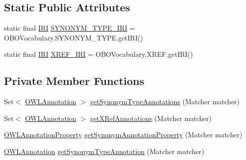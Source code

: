 \subsection*{Static Public Attributes}
\begin{DoxyCompactItemize}
\item 
static final \hyperlink{classorg_1_1semanticweb_1_1owlapi_1_1model_1_1_i_r_i}{I\-R\-I} \hyperlink{classorg_1_1coode_1_1owlapi_1_1obo_1_1parser_1_1_synonym_tag_value_handler_ae93ffc065e9676250659002037c4039d}{S\-Y\-N\-O\-N\-Y\-M\-\_\-\-T\-Y\-P\-E\-\_\-\-I\-R\-I} = O\-B\-O\-Vocabulary.\-S\-Y\-N\-O\-N\-Y\-M\-\_\-\-T\-Y\-P\-E.\-get\-I\-R\-I()
\item 
static final \hyperlink{classorg_1_1semanticweb_1_1owlapi_1_1model_1_1_i_r_i}{I\-R\-I} \hyperlink{classorg_1_1coode_1_1owlapi_1_1obo_1_1parser_1_1_synonym_tag_value_handler_a57fda867a26e9336c4c52b1d08ef62bb}{X\-R\-E\-F\-\_\-\-I\-R\-I} = O\-B\-O\-Vocabulary.\-X\-R\-E\-F.\-get\-I\-R\-I()
\end{DoxyCompactItemize}
\subsection*{Private Member Functions}
\begin{DoxyCompactItemize}
\item 
Set$<$ \hyperlink{interfaceorg_1_1semanticweb_1_1owlapi_1_1model_1_1_o_w_l_annotation}{O\-W\-L\-Annotation} $>$ \hyperlink{classorg_1_1coode_1_1owlapi_1_1obo_1_1parser_1_1_synonym_tag_value_handler_a2e54dcf8155b24189bd23c370109ff88}{get\-Synonym\-Type\-Annotations} (Matcher matcher)
\item 
Set$<$ \hyperlink{interfaceorg_1_1semanticweb_1_1owlapi_1_1model_1_1_o_w_l_annotation}{O\-W\-L\-Annotation} $>$ \hyperlink{classorg_1_1coode_1_1owlapi_1_1obo_1_1parser_1_1_synonym_tag_value_handler_aaf46aa5b3ae68706edfbb1af9308fcf6}{get\-X\-Ref\-Annotations} (Matcher matcher)
\item 
\hyperlink{interfaceorg_1_1semanticweb_1_1owlapi_1_1model_1_1_o_w_l_annotation_property}{O\-W\-L\-Annotation\-Property} \hyperlink{classorg_1_1coode_1_1owlapi_1_1obo_1_1parser_1_1_synonym_tag_value_handler_a9f306fa6afd19119f69b3ba53535ef52}{get\-Synonym\-Annotation\-Property} (Matcher matcher)
\item 
\hyperlink{interfaceorg_1_1semanticweb_1_1owlapi_1_1model_1_1_o_w_l_annotation}{O\-W\-L\-Annotation} \hyperlink{classorg_1_1coode_1_1owlapi_1_1obo_1_1parser_1_1_synonym_tag_value_handler_a28ced8c2f85e9207e880c8ef5499966c}{get\-Synonym\-Type\-Annotation} (Matcher matcher)
\end{DoxyCompactItemize}
